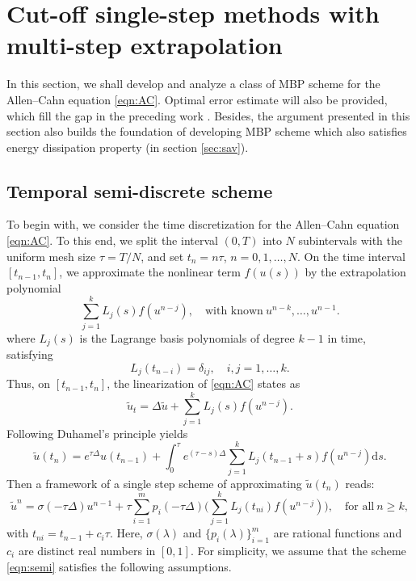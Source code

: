 \documentclass[10pt,final,leqno,onefignum,onetabnum]{siamltex}%
\def\d{\textrm{d}}
\def\d{\mathrm{d}}
\begin{document}
\section{Cut-off single-step methods with multi-step extrapolation}\label{sec:single}

In this section, we shall develop and analyze a class of MBP scheme for the Allen--Cahn equation \eqref{eqn:AC}.
Optimal error estimate will also be provided,  which fill the gap in the preceding work \cite{LiYangZhou:sisc}.
Besides, the argument presented in this section also builds the foundation of developing MBP
scheme which also satisfies energy dissipation property (in section \ref{sec:sav}).

\subsection{Temporal semi-discrete scheme}
To begin with, we consider the time discretization for the Allen--Cahn equation \eqref{eqn:AC}.
To this end, we split the interval $(0,T)$ into $N$ subintervals with the uniform mesh size $\tau=T/N$,
and set $t_n = n\tau$, $n=0,1,\ldots,N$.
On the time interval $[t_{n-1},t_n]$, we approximate the nonlinear term $f(u(s))$ by the extrapolation polynomial
$$
 \sum_{j=1}^{k} L_j(s) f(u^{n-j}),\quad \text{with known}~ u^{n-k},\ldots,u^{n-1}.
$$
where $L_j(s)$ is the Lagrange basis polynomials of degree $k-1$ in time, satisfying
$$
L_j(t_{n-i}) = \delta_{ij}, \quad i,j=1,\dots,k.
$$
Thus, on $[t_{n-1},t_n]$, the linearization of \eqref{eqn:AC} states as
$$\tilde{u}_t=\Delta\tilde{u}+\sum_{j=1}^{k} L_j(s) f(u^{n-j}).$$
Following Duhamel's principle yields
$$\tilde{u}(t_{n})=e^{\tau\Delta}u(t_{n-1})+\int_0^\tau e^{(\tau-s)\Delta}\sum_{j=1}^{k} L_j(t_{n-1}+s) f(u^{n-j})\d s.$$
Then a framework of a single step scheme of approximating $\tilde{u}(t_{n})$ reads:
\begin{equation}\label{eqn:semi}
\tilde u^{n} = \sigma(-\tau\Delta) u^{n-1} + \tau \sum_{i=1}^m p_i(-\tau \Delta)
\Big(\sum_{j=1}^{k} L_j (t_{ni}) f(u^{n-j})\Big),\quad \text{for all}~n\ge k,
\end{equation}
with $t_{ni}=t_{n-1} + c_i\tau$.
Here,
$\sigma(\lambda)$ and $\{p_i(\lambda)\}^m_{i=1}$ are rational functions and $c_i$ are distinct real numbers in $[0,1]$.
For simplicity, we assume that the scheme \eqref{eqn:semi} satisfies the following assumptions.
\end{document}
